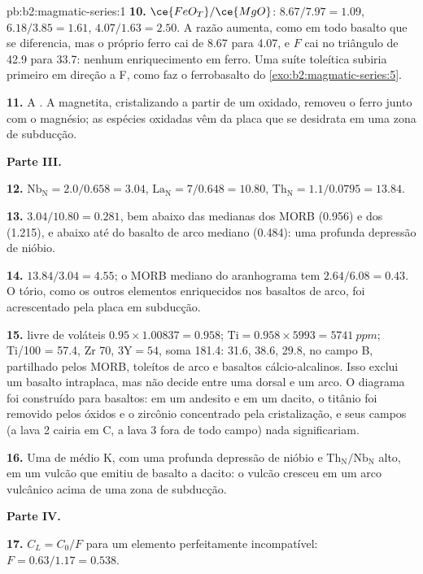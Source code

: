 \begin{solution}{pb:b2:magmatic-series:1}
\textbf{10.} $\ce{FeO_T}/\ce{MgO}$: $8.67/7.97 = 1.09$, $6.18/3.85 = 1.61$, $4.07/1.63 =
2.50$. A razão aumenta, como em todo basalto que se diferencia, mas o próprio ferro
cai de 8.67 para 4.07, e $F$ cai no triângulo de 42.9 para 33.7: nenhum
enriquecimento em ferro. Uma suíte toleítica subiria primeiro em direção a F, como faz o ferrobasalto do
\cref{exo:b2:magmatic-series:5}.

\textbf{11.} A . A magnetita, cristalizando a partir de um  oxidado,
removeu o ferro junto com o magnésio; as espécies oxidadas vêm da placa que se desidrata em uma
zona de subducção.

\noindent\textbf{Parte III.}

\textbf{12.} $\mathrm{Nb_N} = 2.0/0.658 = 3.04$, $\mathrm{La_N} = 7/0.648 = 10.80$,
$\mathrm{Th_N} = 1.1/0.0795 = 13.84$.

\textbf{13.} $3.04/10.80 = 0.281$, bem abaixo das medianas dos MORB (0.956) e dos
 (1.215), e abaixo até do basalto de arco mediano (0.484): uma profunda
depressão de nióbio.

\textbf{14.} $13.84/3.04 = 4.55$; o MORB mediano do aranhograma tem $2.64/6.08 =
0.43$. O tório, como os outros elementos enriquecidos nos basaltos de arco, foi acrescentado pela
placa em subducção.

\textbf{15.}  livre de voláteis $0.95\times1.00837 = 0.958$; $\mathrm{Ti} =
0.958\times5993 = \qty{5741}{ppm}$; Ti/100 = 57.4, Zr 70, $3\mathrm Y = 54$, soma 181.4:
31.6, 38.6, 29.8, no campo B, partilhado pelos MORB, toleítos de arco e basaltos cálcio-alcalinos.
Isso exclui um basalto intraplaca, mas não decide entre uma dorsal e um arco. O
diagrama foi construído para basaltos: em um andesito e em um dacito, o titânio foi removido
pelos óxidos e o zircônio concentrado pela cristalização, e seus campos (a lava 2
cairia em C, a lava 3 fora de todo campo) nada significariam.

\textbf{16.} Uma  de médio K, com uma profunda depressão de nióbio e
$\mathrm{Th_N}/\mathrm{Nb_N}$ alto, em um vulcão que emitiu de basalto a dacito: o vulcão
cresceu em um arco vulcânico acima de uma zona de subducção.

\noindent\textbf{Parte IV.}

\textbf{17.} $C_L = C_0/F$ para um elemento perfeitamente incompatível: $F = 0.63/1.17 =
0.538$.


\end{solution}

